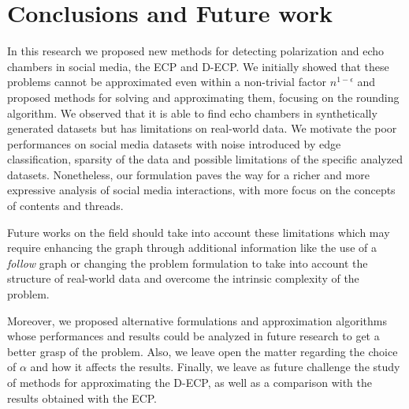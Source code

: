 \chapter{Conclusions and Future work}
\label{ch:conclusionsAndFutureWork}

In this research we proposed new methods for detecting polarization and echo
chambers in social media, the \acrshort{ECP} and \acrshort{D-ECP}. We
initially showed that these problems cannot be approximated even within a
non-trivial factor $n^{1-\epsilon}$ and proposed methods for solving and
approximating them, focusing on the rounding algorithm. We observed that it is
able to find echo chambers in synthetically generated datasets but has limitations on
real-world data. We motivate the poor performances on social media datasets
with noise introduced by edge classification, sparsity of the data and
possible limitations of the specific analyzed datasets. Nonetheless, our formulation paves the way for a richer and more
expressive analysis of social media interactions, with more focus on the
concepts of contents and threads.

Future works on the field should take into account these limitations which
may require enhancing the graph through additional information like the use
of a \emph{follow} graph or
changing the problem formulation to take into account the structure
of real-world data and overcome the intrinsic complexity of the problem.

Moreover, we proposed alternative formulations and approximation algorithms
whose performances and results could be analyzed in future research to get a
better grasp of the problem. Also, we leave open the matter regarding the
choice of $\alpha$ and how it affects the results. Finally, we leave as future
challenge the study of methods for approximating the \acrshort{D-ECP}, as well
as a comparison with the results obtained with the \acrshort{ECP}.
